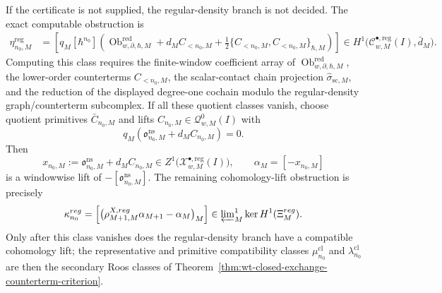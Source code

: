 \begin{prop}
  If the certificate is not supplied, the regular-density branch is not
  decided.  The exact computable obstruction is
  \[
  \begin{aligned}
    \eta^{\mathrm{reg}}_{n_0,M}
      &=
    \left[
      q_M[\hbar^{n_0}]\left(
        \operatorname{Ob}^{\mathrm{red}}_{w,\partial,\hbar,M}
        +d_MC_{<n_0,M}
        +\frac12\{C_{<n_0,M},C_{<n_0,M}\}_{\hbar,M}
      \right)
    \right]
      \in
    H^1\bigl(\mathcal C^{\bullet,\mathrm{reg}}_{w,M}(I),\bar d_M\bigr).
  \end{aligned}
  \]
  Computing this class requires the finite-window coefficient array of
  \(\operatorname{Ob}^{\mathrm{red}}_{w,\partial,\hbar,M}\), the lower-order
  counterterms \(C_{<n_0,M}\), the scalar-contact chain projection
  \(\widehat\sigma_{\mathrm{sc},M}\), and the reduction of the displayed
  degree-one cochain modulo the regular-density graph/counterterm
  subcomplex.  If all these quotient classes vanish, choose quotient
  primitives \(\bar C_{n_0,M}\) and lifts \(C_{n_0,M}\in
  \mathcal Q^0_{w,M}(I)\) with
  \[
    q_M(\mathfrak o^{\mathrm{ns}}_{n_0,M}+d_MC_{n_0,M})=0.
  \]
  Then
  \[
    x_{n_0,M}:=
    \mathfrak o^{\mathrm{ns}}_{n_0,M}+d_MC_{n_0,M}
      \in
    Z^1\bigl(\mathcal X^{\bullet,\mathrm{reg}}_{w,M}(I)\bigr),
    \qquad
    \alpha_M=[-x_{n_0,M}]
  \]
  is a windowwise lift of
  \(-[\mathfrak o^{\mathrm{ns}}_{n_0,M}]\).  The remaining
  cohomology-lift obstruction is precisely
  \[
    \kappa^{\mathrm{reg}}_{n_0}
      =
    \left[
      \bigl(
        \rho^{X,\mathrm{reg}}_{M+1,M}\alpha_{M+1}-\alpha_M
      \bigr)_M
    \right]
      \in
    \varprojlim\nolimits^1_M
    \ker H^1(\Xi^{\mathrm{reg}}_M).
  \]
  Only after this class vanishes does the regular-density branch have a
  compatible cohomology lift; the representative and primitive
  compatibility classes
  \(\mu^{\mathrm{cl}}_{n_0}\) and \(\lambda^{\mathrm{cl}}_{n_0}\) are then
  the secondary Roos classes of
  Theorem~\ref{thm:wt-closed-exchange-counterterm-criterion}.
\end{prop}

